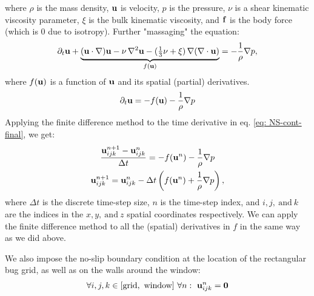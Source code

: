 where $\rho$ is the mass density, $\mathbf{u}$ is velocity, $p$ is the pressure, $\nu$ is a shear kinematic viscosity parameter, $\xi$ is the bulk kinematic viscosity, and $\mathbf{f}$ is the body force (which is 0 due to isotropy).
Further "massaging" the equation:
\begin{gather}
    \partial_t \mathbf{u} + \underbrace{(\mathbf {u} \cdot \nabla) \mathbf{u} -\nu \,\nabla ^{2}\mathbf{u}-({\tfrac {1}{3}}\nu +\xi )\,\nabla (\nabla \cdot \mathbf{u})}_{f\left(\mathbf{u}\right)} =-{\frac {1}{\rho }}\nabla p,
\end{gather}
where $f(\mathbf{u})$ is a function of $\mathbf{u}$ and its spatial (partial) derivatives.
\begin{gather}
    \partial_t \mathbf{u}  = -f(\mathbf{u}) -{\frac {1}{\rho }}\nabla p \label{eq: NS-cont-final}
\end{gather}
Applying the finite difference method to the time derivative in eq. \ref{eq: NS-cont-final}, we get:
\begin{gather}
    \frac{\mathbf{u}_{ijk}^{n+1} - \mathbf{u}_{ijk}^n}{\Delta t} = -f(\mathbf{u}^n) -{\frac {1}{\rho }}\nabla p \\
    \mathbf{u}_{ijk}^{n+1} = \mathbf{u}_{ijk}^n - \Delta t \left(f(\mathbf{u}^n) + {\frac {1}{\rho }}\nabla p\right), \label{eq: NS-fd}
\end{gather}
where $\Delta t$ is the discrete time-step size, $n$ is the time-step index, and $i,j,~\text{and}~k$ are the indices in the $x,y,~\text{and}~z$ spatial coordinates respectively. We can apply the finite difference method to all the (spatial) derivatives in $f$ in the same way as we did above.

We also impose the no-slip boundary condition at the location of the rectangular bug grid, as well as on the walls around the window:
\begin{gather}
    \forall i,j,k \in [\text{grid},~\text{window}] ~\forall n:~ \mathbf{u}_{ijk}^n = \mathbf{0} \label{eq: boundary}
\end{gather}
